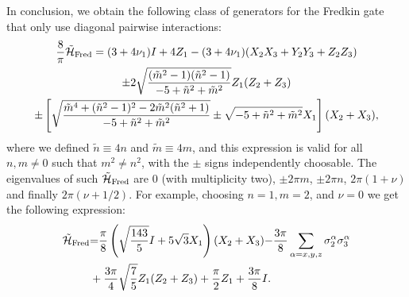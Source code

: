 In conclusion, we obtain the following class of generators for the Fredkin gate that only use diagonal pairwise interactions:
\begin{equation}
\begin{gathered}
    \frac{8}{\pi}\tilde{{\mathcal{H}}}_{\operatorname{Fred}} =
    (3 + 4\nu_1) I + 4 Z_1
    - (3 + 4\nu_1) (X_2 X_3 + Y_2 Y_3 + Z_2 Z_3) \\
    \pm 2 \sqrt{\frac{
        (\tilde m^2-1)(\tilde n^2-1)
    }{
        -5 + \tilde n^2 + \tilde m^2
    }} Z_1 ( Z_2 + Z_3) \\
    \pm \left[
    \sqrt{\frac{
        \tilde m^4 + (\tilde n^2-1)^2 - 2 \tilde m^2(\tilde n^2+1)
    }{
        -5 + \tilde n^2 + \tilde m^2
    }}
    \pm \sqrt{-5 + \tilde n^2 + \tilde m^2} X_1
    \right] (X_2 + X_3),
\end{gathered}
\end{equation}
where we defined $\tilde n\equiv 4n$ and $\tilde m\equiv 4m$, and this expression is valid for all $n,m\neq0$ such that $m^2\neq n^2$, with the $\pm$ signs independently choosable.
The eigenvalues of such $\tilde{{\mathcal{H}}}_{\operatorname{Fred}}$ are $0$ (with multiplicity two), $\pm 2\pi m$, $\pm2\pi n$, $2\pi(1+\nu)$ and finally $2\pi(\nu+1/2)$.  
For example, choosing $n=1, m=2$, and $\nu=0$ we get the following expression:
\begin{align}
    \tilde{{\mathcal{H}}}_{\operatorname{Fred}} &{=} 
    \frac{\pi}{8} \left( \sqrt{\frac{143}{5}}I+5\sqrt 3 X_1\right)(X_2 + X_3) {-}\frac{3\pi}{8} \sum_{\alpha=x,y,z}\sigma^\alpha_2 \sigma^\alpha_3
    \nonumber\\
    &+
    \frac{3\pi}{4}\sqrt{\frac{7}{5}}Z_1(Z_2+Z_3) +\frac{\pi}{2}Z_1+\frac{3\pi}{8}I.
    \label{eq:fredkin_generator}
\end{align}

